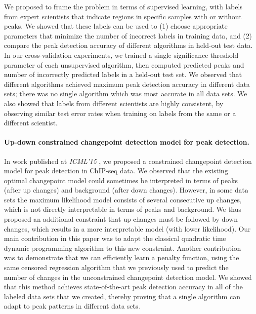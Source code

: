 \documentclass{article}
\begin{document}
We proposed to frame the problem in terms of supervised learning, with
labels from expert scientists that indicate regions in specific
samples with or without peaks. We showed that these labels can be used
to (1) choose appropriate parameters that minimize the number of
incorrect labels in training data, and (2) compare the peak detection
accuracy of different algorithms in held-out test data. In our
cross-validation experiments, we trained a single significance
threshold parameter of each unsupervised algorithm, then computed
predicted peaks and number of incorrectly predicted labels in a
held-out test set. We observed that different algorithms achieved
maximum peak detection accuracy in different data sets; there was no
single algorithm which was most accurate in all data sets. We also
showed that labels from different scientists are highly consistent, by
observing similar test error rates when training on labels from the
same or a different scientist.

\paragraph{Up-down constrained changepoint detection model for peak
  detection.} In work published at \emph{ICML'15}
\citep{HOCKING-PeakSeg}, we proposed a constrained changepoint
detection model for peak detection in ChIP-seq data. We observed that
the existing optimal changepoint model could sometimes be interpreted
in terms of peaks (after up changes) and background (after down
changes). However, in some data sets the maximum likelihood model
consists of several consecutive up changes, which is not directly
interpretable in terms of peaks and background. We thus proposed an
additional constraint that up changes must be followed by down
changes, which results in a more interpretable model (with lower
likelihood). Our main contribution in this paper was to adapt the
classical quadratic time dynamic programming algorithm to this new
constraint. Another contribution was to demonstrate that we can
efficiently learn a penalty function, using the same censored
regression algorithm that we previously used to predict the number of
changes in the unconstrained changepoint detection model. We showed
that this method achieves state-of-the-art peak detection accuracy in
all of the labeled data sets that we created, thereby proving that a
single algorithm can adapt to peak patterns in different data sets.
\end{document}
